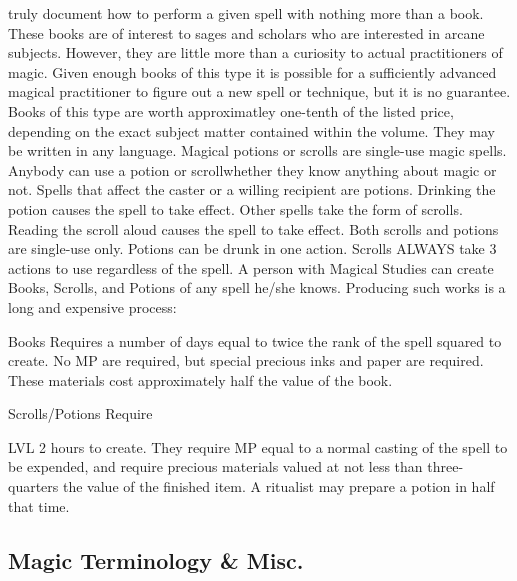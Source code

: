 \documentclass[twoside]{book}
\begin{document}
               truly document how to perform a given spell with nothing
               more than a book. These books are of interest to sages and
               scholars who are interested in arcane subjects. However,
               they are little more than a curiosity to actual
               practitioners of magic. Given enough books of this type it
               is possible for a sufficiently advanced magical
               practitioner to figure out a new spell or technique, but
               it is no guarantee. Books of this type are worth
               approximatley one-tenth of the listed price, depending on
               the exact subject matter contained within the volume. They
               may be written in any language.   Magical potions or scrolls are single-use magic
               spells. Anybody can use a potion or scrollwhether
               they know anything about magic or not. Spells that affect
               the caster or a willing recipient are potions. Drinking
               the potion causes the spell to take effect. Other spells
               take the form of scrolls. Reading the scroll aloud causes
               the spell to take effect. Both scrolls and potions are
               single-use only. Potions can be drunk in one action.
               Scrolls ALWAYS take 3 actions to use regardless of the
               spell.   A person with Magical Studies can create Books,
               Scrolls, and Potions of any spell he/she knows. Producing
               such works is a long and expensive process:   
              
                  Books   Requires a number of
                  days equal to twice the rank of the spell squared to
                  create. No MP are required, but special precious inks
                  and paper are required. These materials cost
                  approximately half the value of the book.
                
              
                   Scrolls/Potions   Require
                     
                       LVL  2 
                        hours       to create.
                      They require MP equal to a normal casting of the
                      spell to be expended, and require precious
                      materials valued at not less than three-quarters
                      the value of the finished item. A ritualist may
                      prepare a potion in half that time.
                
            
\subsection{Magic Terminology \& Misc.}
      
\end{document}
